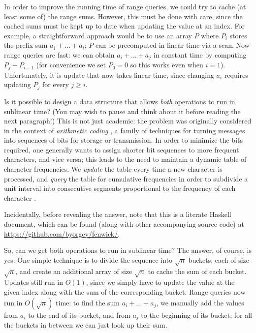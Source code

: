 \documentclass{jfp}
\renewcommand{\geq}{\geqslant}
\theoremstyle{definition}
\theoremstyle{remark}
\begin{document}
In order to improve the running time of range queries, we could try to
cache (at least some of) the range sums.  However, this must be done
with care, since the cached sums must be kept up to date when updating
the value at an index.  For example, a straightforward approach would
be to use an array $P$ where $P_i$ stores the prefix sum
$a_1 + \dots + a_i$; $P$ can be precomputed in linear time via a scan.
Now range queries are fast: we can obtain $a_i + \dots + a_j$ in
constant time by computing $P_j - P_{i-1}$ (for convenience we set
$P_0 = 0$ so this works even when $i=1$).  Unfortunately, it is update
that now takes linear time, since changing $a_i$ requires updating
$P_j$ for every $j \geq i$.

Is it possible to design a data structure that allows \emph{both}
operations to run in sublinear time?  (You may wish to pause and think
about it before reading the next paragraph!)  This is not just
academic: the problem was originally considered in the context of
\emph{arithmetic coding} \citep{rissanen1979arithmetic,
  bird2002arithmetic}, a family of techniques for turning messages
into sequences of bits for storage or transmission.  In order to
minimize the bits required, one generally wants to assign shorter bit
sequences to more frequent characters, and vice versa; this leads to
the need to maintain a dynamic table of character frequencies.  We
\emph{update} the table every time a new character is processed, and
\emph{query} the table for cumulative frequencies in order to
subdivide a unit interval into consecutive segments proportional to
the frequency of each character \citep{fenwick1994new, ryabko1989fast}.

Incidentally, before revealing the answer, note that this is a
literate Haskell document, which can be found (along with other
accompanying source code) at
\url{https://github.com/byorgey/fenwick/}.

So, can we get both operations to run in sublinear time?  The answer,
of course, is yes.  One simple technique is to divide the sequence
into $\sqrt n$ buckets, each of size $\sqrt n$, and create an
additional array of size $\sqrt n$ to cache the sum of each bucket.
Updates still run in $O(1)$, since we simply have to update the value
at the given index along with the sum of the corresponding bucket.
Range queries now run in $O(\sqrt n)$ time: to find the sum
$a_i + \dots + a_j$, we manually add the values from $a_i$ to the end
of its bucket, and from $a_j$ to the beginning of its bucket; for all
the buckets in between we can just look up their sum.
\end{document}

